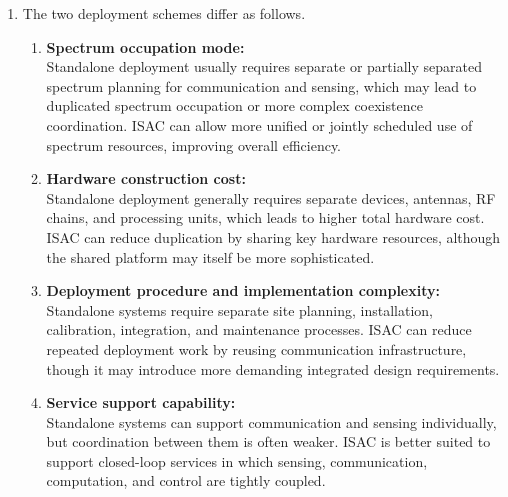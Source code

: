 \begin{enumerate}[label=\textbf{\arabic*.}, leftmargin=*]
    Before 5G, this limitation was less evident because most services mainly required content delivery, voice, messaging, or internet access. In such scenarios, the network did not need to understand the environment in real time. However, in the 6G era, services such as autonomous driving, industrial automation, digital twins, extended reality, and low-altitude UAV management require the network not only to connect devices, but also to know where objects are, how they move, and what the environmental state is. For example, in autonomous driving, merely transmitting data is insufficient if the network cannot support real-time awareness of vehicles, pedestrians, and road conditions. Thus, the lack of native environmental awareness becomes increasingly restrictive.

    \item 
    The two deployment schemes differ as follows.

    \begin{enumerate}[label=(\alph*)]
        \item \textbf{Spectrum occupation mode:} \\
        Standalone deployment usually requires separate or partially separated spectrum planning for communication and sensing, which may lead to duplicated spectrum occupation or more complex coexistence coordination. ISAC can allow more unified or jointly scheduled use of spectrum resources, improving overall efficiency.

        \item \textbf{Hardware construction cost:} \\
        Standalone deployment generally requires separate devices, antennas, RF chains, and processing units, which leads to higher total hardware cost. ISAC can reduce duplication by sharing key hardware resources, although the shared platform may itself be more sophisticated.

        \item \textbf{Deployment procedure and implementation complexity:} \\
        Standalone systems require separate site planning, installation, calibration, integration, and maintenance processes. ISAC can reduce repeated deployment work by reusing communication infrastructure, though it may introduce more demanding integrated design requirements.

        \item \textbf{Service support capability:} \\
        Standalone systems can support communication and sensing individually, but coordination between them is often weaker. ISAC is better suited to support closed-loop services in which sensing, communication, computation, and control are tightly coupled.
    \end{enumerate}


\end{enumerate}
